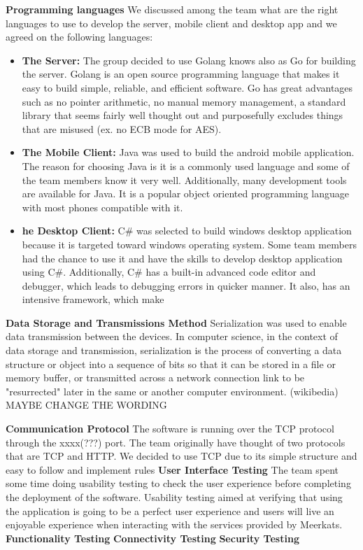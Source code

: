 \documentclass{article}
\begin{document}
\newline
\hfill \break
\textbf{Programming languages}
We discussed among the team what are the right languages to use to develop the server, mobile client and desktop app and we agreed on the following languages:
\begin{itemize}
\item\textbf{The Server:} The group decided to use Golang knows also as Go for building the server. Golang is an open source programming language that makes it easy to build simple, reliable, and efficient software. Go has great advantages such as no pointer arithmetic, no manual memory management, a standard library that seems fairly well thought out and purposefully excludes things that are misused (ex. no ECB mode for AES).
\item\textbf{The Mobile Client:} Java was used to build the android mobile application. The reason for choosing Java is it is a commonly used language and some of the team members know it very well.
Additionally, many development tools are available for Java. It is a popular object oriented programming language with most phones compatible with it.
\item\textbf{he Desktop Client:} C# was selected to build windows desktop application because it is targeted toward windows operating system. Some team members had the chance to use it and have the skills to develop desktop application using C#. Additionally, C# has a built-in advanced code editor and debugger, which leads to debugging errors in quicker manner. It also, has an intensive framework, which make
\end{itemize}
\newline
\hfill \break
\textbf{Data Storage and Transmissions Method}
Serialization was used to enable data transmission between the devices. In computer science, in the context of data storage and transmission, serialization is the process of converting a data structure or object into a sequence of bits so that it can be stored in a file or memory buffer, or transmitted across a network connection link to be "resurrected" later in the same or another computer environment. (wikibedia) MAYBE CHANGE THE WORDING

\newline
\hfill \break
\textbf{Communication Protocol}
The software is running over the TCP protocol through the xxxx(???) port. The team originally have thought of two protocols that are TCP and HTTP. We decided to use TCP due to its simple structure and easy to follow and implement rules
\newline
\hfill \break
\textbf{User Interface Testing}
The team spent some time doing usability testing to check the user experience before completing the deployment of the software. Usability testing aimed at verifying that using the application is going to be a perfect user experience and users will live an enjoyable experience when interacting with the services provided by Meerkats.
\newline
\hfill \break
\textbf{Functionality Testing}
\newline
\hfill \break
\textbf{Connectivity Testing}
\newline
\hfill \break
\textbf{Security Testing}
\end{document}
